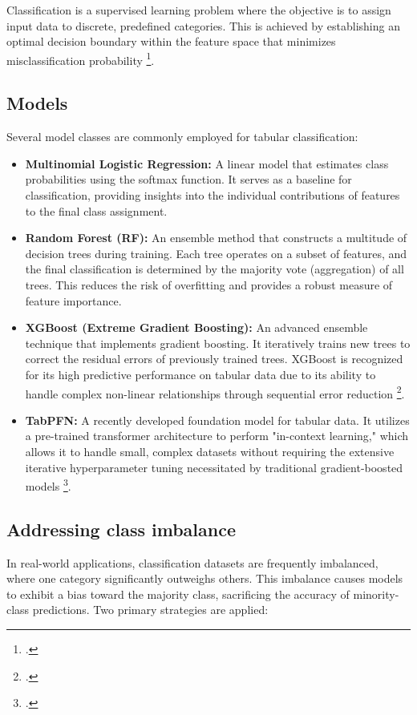 \begin{refsection}
Classification is a supervised learning problem where the objective is to assign input data to discrete, predefined categories. This is achieved by establishing an optimal decision boundary within the feature space that minimizes misclassification probability \footcite{parmar_review_2019}.

\subsection{Models}
Several model classes are commonly employed for tabular classification:
\begin{itemize}
    \item \textbf{Multinomial Logistic Regression:} A linear model that estimates class probabilities using the softmax function. It serves as a baseline for classification, providing insights into the individual contributions of features to the final class assignment.
    \item \textbf{Random Forest (RF):} An ensemble method that constructs a multitude of decision trees during training. Each tree operates on a subset of features, and the final classification is determined by the majority vote (aggregation) of all trees. This reduces the risk of overfitting and provides a robust measure of feature importance.
    \item \textbf{XGBoost (Extreme Gradient Boosting):} An advanced ensemble technique that implements gradient boosting. It iteratively trains new trees to correct the residual errors of previously trained trees. XGBoost is recognized for its high predictive performance on tabular data due to its ability to handle complex non-linear relationships through sequential error reduction \footcite{Chen:2016btl}.
    \item \textbf{TabPFN:} A recently developed foundation model for tabular data. It utilizes a pre-trained transformer architecture to perform "in-context learning," which allows it to handle small, complex datasets without requiring the extensive iterative hyperparameter tuning necessitated by traditional gradient-boosted models \footcite{hollmann_tabpfn_2023, hollmann_accurate_2025}.
\end{itemize}

\subsection{Addressing class imbalance}

In real-world applications, classification datasets are frequently imbalanced, where one category significantly outweighs others. This imbalance causes models to exhibit a bias toward the majority class, sacrificing the accuracy of minority-class predictions. Two primary strategies are applied:


\end{refsection}
